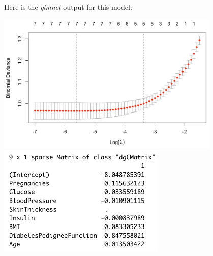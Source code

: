 \begin{question}{}
Here is the \emph{glmnet} output for this model:
\begin{center}
\includegraphics[width=0.8\textwidth]{img/pima-glmnet-plot.png}
\includegraphics[width=0.6\textwidth]{img/pima-glmnet-output.png}
\end{center}
\end{question}


